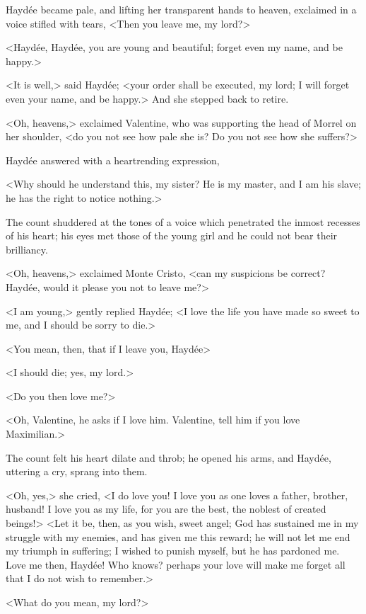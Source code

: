 Haydée became pale, and lifting her transparent hands to heaven, exclaimed in a voice stifled with tears, <Then you leave me, my lord?> 

 <Haydée, Haydée, you are young and beautiful; forget even my name, and be happy.> 

 <It is well,> said Haydée; <your order shall be executed, my lord; I will forget even your name, and be happy.> And she stepped back to retire. 

 <Oh, heavens,> exclaimed Valentine, who was supporting the head of Morrel on her shoulder, <do you not see how pale she is? Do you not see how she suffers?> 

 Haydée answered with a heartrending expression, 

 <Why should he understand this, my sister? He is my master, and I am his slave; he has the right to notice nothing.> 

 The count shuddered at the tones of a voice which penetrated the inmost recesses of his heart; his eyes met those of the young girl and he could not bear their brilliancy. 

 <Oh, heavens,> exclaimed Monte Cristo, <can my suspicions be correct? Haydée, would it please you not to leave me?> 

 <I am young,> gently replied Haydée; <I love the life you have made so sweet to me, and I should be sorry to die.> 

 <You mean, then, that if I leave you, Haydée\longdash> 

 <I should die; yes, my lord.> 

 <Do you then love me?> 

 <Oh, Valentine, he asks if I love him. Valentine, tell him if you love Maximilian.> 

 The count felt his heart dilate and throb; he opened his arms, and Haydée, uttering a cry, sprang into them. 

 <Oh, yes,> she cried, <I do love you! I love you as one loves a father, brother, husband! I love you as my life, for you are the best, the noblest of created beings!>  <Let it be, then, as you wish, sweet angel; God has sustained me in my struggle with my enemies, and has given me this reward; he will not let me end my triumph in suffering; I wished to punish myself, but he has pardoned me. Love me then, Haydée! Who knows? perhaps your love will make me forget all that I do not wish to remember.> 

 <What do you mean, my lord?> 

